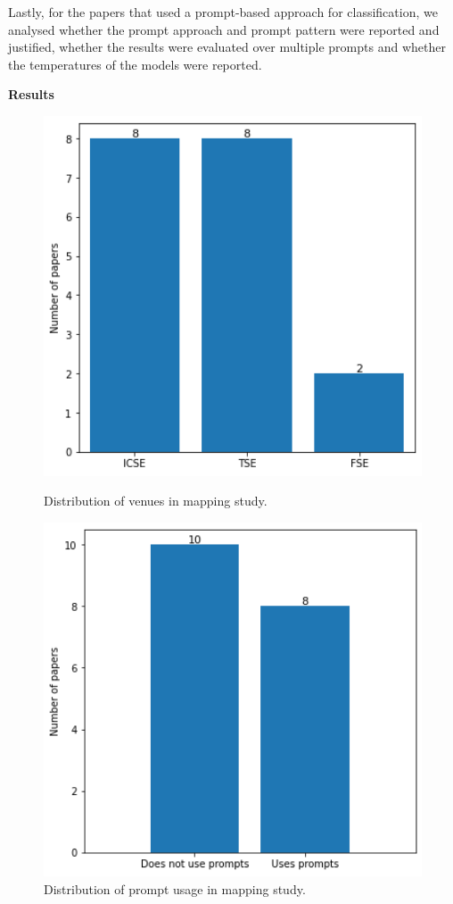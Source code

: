 \documentclass[a4paper]{article}
\begin{document}
Lastly, for the papers that used a prompt-based approach for classification, we analysed whether the prompt approach and prompt pattern were reported and justified, whether the results were evaluated over multiple prompts and whether the temperatures of the models were reported.

\textbf{Results}\\
\begin{figure}[h]
	\hfill
	\begin{minipage}{0.45\textwidth}
		\includegraphics[width=1\textwidth]{figures/Venues.png}
		\caption{Distribution of venues in mapping study.}
		\label{fig:Venues}
	\end{minipage}
	\hfill
	\begin{minipage}{0.45\textwidth}
		\includegraphics[width=1\textwidth]{figures/Prompts.png}
		\caption{Distribution of prompt usage in mapping study.}
		\label{fig:Prompts}
	\end{minipage}
	\hfill
\end{figure}
\end{document}
